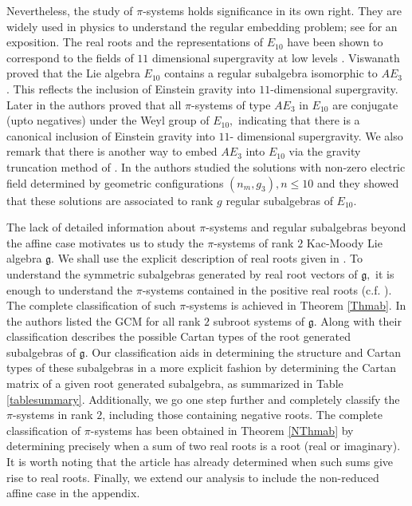 \documentclass[12pt,reqno]{amsart}
\theoremstyle{plain}
\theoremstyle{definition}
\theoremstyle{remark}
\newcommand{\lie}[1]{\mathfrak{#1}}
\begin{document}
 Nevertheless, the study of $\pi$-systems holds significance in its own right. They are widely used in physics to understand the regular embedding problem; see \cite{damour03cosmological, feingold83ahyperbolic, superspace81} for an exposition.
 The real roots and the representations of $E_{10}$ have been shown to correspond to the fields of $11$ dimensional supergravity at low levels \cite{damour03cosmological}. Viswanath proved that the Lie algebra $E_{10}$ contains a regular subalgebra isomorphic to $AE_3$ \cite{viswanath08embedding}. This reflects the inclusion of Einstein gravity into $11$-dimensional supergravity. Later in \cite[Theorem 6.2]{carbone2021varvec} the authors proved that all $\pi$-systems of type $AE_3$ in $E_{10}$ are conjugate (upto negatives) under the Weyl group of $E_{10},$ indicating that there is a canonical inclusion of Einstein gravity into $11$- dimensional supergravity. We also remark that there is another way to embed $AE_3$ into $E_{10}$ via the gravity truncation method of \cite{damour09fermionic}. In \cite{Henn06Geometric} the authors studied the solutions with non-zero electric field determined by geometric configurations $(n_m,g_3), n\le 10$ and they showed that these solutions are associated to rank $g$ regular subalgebras of $E_{10}.$

 The lack of detailed information about $\pi$-systems and regular subalgebras beyond the affine case motivates us to study the $\pi$-systems of rank $2$ Kac-Moody Lie algebra $\lie g$. We shall use the explicit description of real roots given in \cite{kac1990infinite}. To understand the symmetric subalgebras generated by real root vectors of $\lie g,$ it is enough to understand the $\pi$-systems contained in the positive real roots (c.f. \cite[Theorem 1]{habib2023root}). The complete classification of such $\pi$-systems is achieved in Theorem \ref{Thmab}. In \cite[Table 2]{carbone2021commutator} the authors listed the GCM for all rank $2$ subroot systems of $\lie g.$ Along with \cite[Theorem 1]{habib2023root} their classification describes the possible Cartan types of the root generated subalgebras of $\lie g.$ Our classification aids in determining the structure and Cartan types of these subalgebras in a more explicit fashion by determining the Cartan matrix of a given root generated subalgebra, as summarized in Table \ref{tablesummary}. Additionally, we go one step further and completely classify the $\pi$-systems in rank $2$, including those containing negative roots. The complete classification of $\pi$-systems has been obtained in Theorem \ref{NThmab} by determining precisely when a sum of two real roots is a root (real or imaginary). It is worth noting that the article \cite{carbone2021commutator} has already determined when such sums give rise to real roots. Finally, we extend our analysis to include the non-reduced affine case in the appendix.\medskip
\end{document}
